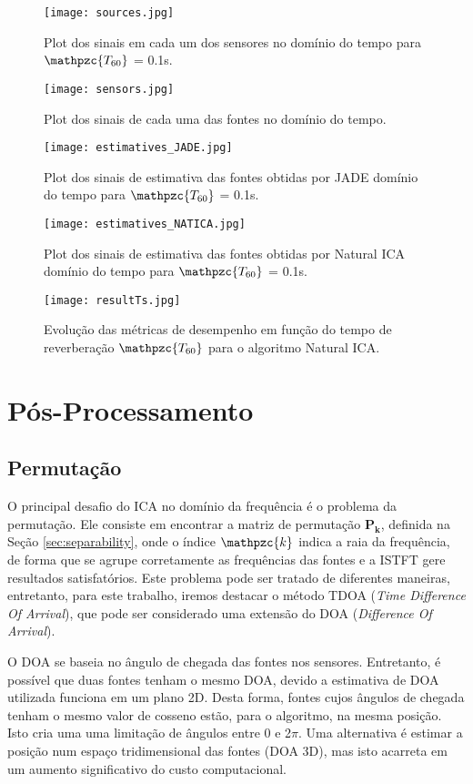     \begin{figure}
        \centering
        \texttt{[image: sources.jpg]}
            \caption{Plot dos sinais em cada um dos sensores no domínio do tempo para $\mathpzc{T_{60}}$ = 0.1s.}
        \label{fig:sources}
        \texttt{[image: sensors.jpg]}
            \caption{Plot dos sinais de cada uma das fontes no domínio do tempo.}
        \label{fig:sensors}
    \end{figure}
    
    \begin{figure}
        \centering
        \texttt{[image: estimatives\_JADE.jpg]}
        \caption{Plot dos sinais de estimativa das fontes obtidas por JADE domínio do tempo para $\mathpzc{T_{60}}$ = 0.1s.}
        \label{fig:JADE}
        \texttt{[image: estimatives\_NATICA.jpg]}
        \caption{Plot dos sinais de estimativa das fontes obtidas por Natural ICA domínio do tempo para $\mathpzc{T_{60}}$ = 0.1s.}
        \label{fig:NATICA}
    \end{figure}
    
    
    \begin{figure}
        \centering
        \texttt{[image: resultTs.jpg]}
        \caption{Evolução das métricas de desempenho em função do tempo de reverberação $\mathpzc{T_{60}}$ para o algoritmo Natural ICA.}
        \label{fig:T60natica}
    \end{figure}
    

    
\section{Pós-Processamento}
    \subsection{Permutação}
    O principal desafio do ICA no domínio da frequência é o problema da permutação. Ele consiste em encontrar a matriz de permutação $\mathbf{P_k}$, definida na Seção \ref{sec:separability}, onde o índice $\mathpzc{k}$ indica a raia da frequência, de forma que se agrupe corretamente as frequências das fontes e a ISTFT gere resultados satisfatórios.
    Este problema pode ser tratado de diferentes maneiras, entretanto, para este trabalho, iremos destacar o método TDOA (\textit{Time Difference Of Arrival}), que pode ser considerado uma extensão do DOA (\textit{Difference Of Arrival}).
    
    O DOA se baseia no ângulo de chegada das fontes nos sensores. Entretanto, é possível que duas fontes tenham o mesmo DOA, devido a estimativa de DOA utilizada funciona em um plano 2D. Desta forma, fontes cujos ângulos de chegada tenham o mesmo valor de cosseno estão, para o algoritmo, na mesma posição. Isto cria uma uma limitação de ângulos entre 0 e 2$\pi$. Uma alternativa é estimar a posição num espaço tridimensional das fontes (DOA 3D), mas isto acarreta em um aumento significativo do custo computacional.
    
